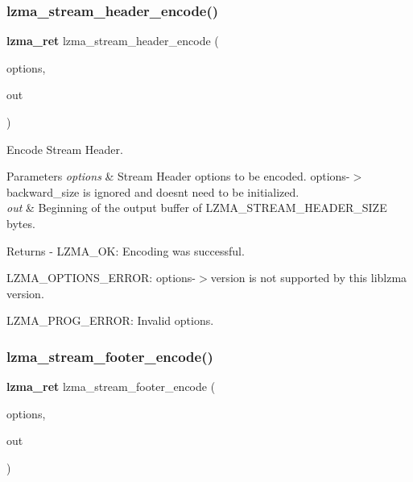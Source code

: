 \subsubsection{lzma\+\_\+stream\+\_\+header\+\_\+encode()}
{\footnotesize\ttfamily \textbf{ lzma\+\_\+ret} lzma\+\_\+stream\+\_\+header\+\_\+encode (\begin{DoxyParamCaption}\item[{const \textbf{ lzma\+\_\+stream\+\_\+flags} $\ast$}]{options,  }\item[{uint8\+\_\+t $\ast$}]{out }\end{DoxyParamCaption})}



Encode Stream Header. 


\begin{DoxyParams}{Parameters}
{\em options} & Stream Header options to be encoded. options-\/$>$backward\+\_\+size is ignored and doesn\textquotesingle{}t need to be initialized. \\
\hline
{\em out} & Beginning of the output buffer of L\+Z\+M\+A\+\_\+\+S\+T\+R\+E\+A\+M\+\_\+\+H\+E\+A\+D\+E\+R\+\_\+\+S\+I\+ZE bytes.\\
\hline
\end{DoxyParams}
\begin{DoxyReturn}{Returns}
-\/ L\+Z\+M\+A\+\_\+\+OK\+: Encoding was successful.
\begin{DoxyItemize}
\item L\+Z\+M\+A\+\_\+\+O\+P\+T\+I\+O\+N\+S\+\_\+\+E\+R\+R\+OR\+: options-\/$>$version is not supported by this liblzma version.
\item L\+Z\+M\+A\+\_\+\+P\+R\+O\+G\+\_\+\+E\+R\+R\+OR\+: Invalid options. 
\end{DoxyItemize}
\end{DoxyReturn}
\mbox{\label{stream__flags__encoder_8c_a163fe11f845c5f0a637052fc00f7242c}} 
\subsubsection{lzma\+\_\+stream\+\_\+footer\+\_\+encode()}
{\footnotesize\ttfamily \textbf{ lzma\+\_\+ret} lzma\+\_\+stream\+\_\+footer\+\_\+encode (\begin{DoxyParamCaption}\item[{const \textbf{ lzma\+\_\+stream\+\_\+flags} $\ast$}]{options,  }\item[{uint8\+\_\+t $\ast$}]{out }\end{DoxyParamCaption})}



